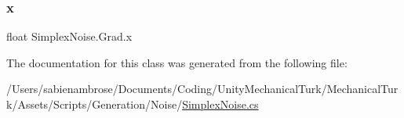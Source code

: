 \subsubsection{\texorpdfstring{x}{x}}
{\footnotesize\ttfamily float Simplex\+Noise.\+Grad.\+x}



The documentation for this class was generated from the following file\+:\begin{DoxyCompactItemize}
\item 
/\+Users/sabienambrose/\+Documents/\+Coding/\+Unity\+Mechanical\+Turk/\+Mechanical\+Turk/\+Assets/\+Scripts/\+Generation/\+Noise/\mbox{\hyperlink{_simplex_noise_8cs}{Simplex\+Noise.\+cs}}\end{DoxyCompactItemize}
